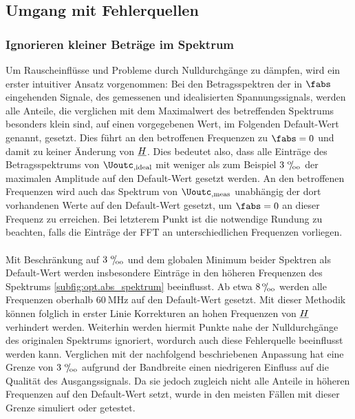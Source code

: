 \documentclass[../Report.tex]{subfiles}
\begin{document}
\subsection{Umgang mit Fehlerquellen}
\label{subsec:opt.H.handle_fehler}
\subsubsection*{Ignorieren kleiner Beträge im Spektrum}
\label{subsubsec:opt.H.prom}

Um Rauscheinflüsse und Probleme durch Nulldurchgänge zu dämpfen, wird ein erster intuitiver Ansatz vorgenommen: Bei den Betragsspektren der in $\fabs$ eingehenden Signale, des gemessenen und idealisierten Spannungssignals, werden alle Anteile, die verglichen mit dem Maximalwert des betreffenden Spektrums besonders klein sind, auf einen vorgegebenen Wert, im Folgenden Default-Wert genannt, gesetzt. Dies führt an den betroffenen Frequenzen zu $\fabs = 0$ und damit zu keiner Änderung von $\underline{H}$.
Dies bedeutet also, dass alle Einträge des Betragsspektrums von $\Uoutc_{,\mathrm{ideal}}$ mit weniger als zum Beispiel $3 \, \, {}^\text{o}\mkern-5mu/\mkern-3mu_\text{oo} $ der maximalen Amplitude auf den Default-Wert gesetzt werden. An den betroffenen Frequenzen wird auch das Spektrum von $\Uoutc_{,\mathrm{meas}}$ unabhängig der dort vorhandenen Werte auf den Default-Wert gesetzt, um $\fabs = 0$ an dieser Frequenz zu erreichen.
Bei letzterem Punkt ist die notwendige Rundung zu beachten, falls die Einträge der FFT an unterschiedlichen Frequenzen vorliegen. 
\\
\\
\noindent
Mit Beschränkung auf $3 \, \, {}^\text{o}\mkern-5mu/\mkern-3mu_\text{oo}$ und dem globalen Minimum beider Spektren als Default-Wert werden insbesondere Einträge in den höheren Frequenzen des Spektrums \ref{subfig:opt.abs_spektrum} beeinflusst. Ab etwa $8 \, {}^\text{o}\mkern-5mu/\mkern-3mu_\text{oo}$ werden alle Frequenzen oberhalb $\SI{60}{\MHz}$ auf den Default-Wert gesetzt. Mit dieser Methodik können folglich in erster Linie Korrekturen an hohen Frequenzen von $\underline{H}$ verhindert werden. Weiterhin werden hiermit Punkte nahe der Nulldurchgänge des originalen Spektrums ignoriert, wordurch auch diese Fehlerquelle beeinflusst werden kann.
Verglichen mit der nachfolgend beschriebenen Anpassung hat eine Grenze von $3 \, \, {}^\text{o}\mkern-5mu/\mkern-3mu_\text{oo}$ aufgrund der Bandbreite einen niedrigeren Einfluss auf die Qualität des Ausgangssignals. Da sie jedoch zugleich nicht alle Anteile in höheren Frequenzen auf den Default-Wert setzt, wurde in den meisten Fällen mit dieser Grenze simuliert oder getestet.
\end{document}

